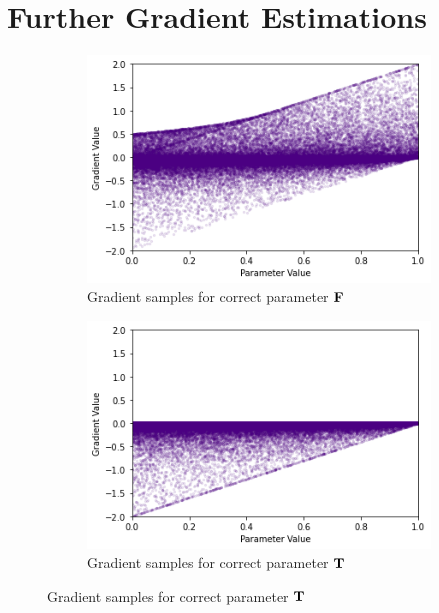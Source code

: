 \chapter{Further Gradient Estimations}
\label{section:moregradients}

\begin{figure}[h]
    \centering
    \begin{subfigure}[b]{0.47\textwidth}
        \centering
        \includegraphics[width=\textwidth]{imgs/grad_prod_2_falseparam.png}
        \caption{Gradient samples for correct parameter $\textbf{F}$}
        \label{fig:conjgrad2false}
    \end{subfigure}
    \begin{subfigure}[b]{0.47\textwidth}
        \centering
        \includegraphics[width=\textwidth]{imgs/grad_prod_2_trueparam.png}
        \caption{Gradient samples for correct parameter $\textbf{T}$}
        \label{fig:conjgrad2true}

\end{subfigure}
\end{figure}
